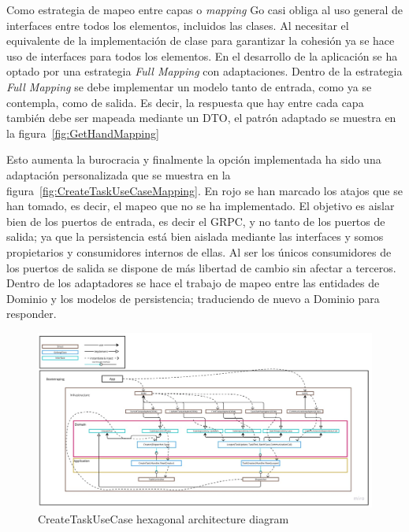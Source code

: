 Como estrategia de mapeo entre capas o \textit{mapping} Go casi obliga al uso general de interfaces entre todos los elementos, incluidos las clases.
Al necesitar el equivalente de la implementación de clase para garantizar la cohesión ya se hace uso de  interfaces para todos los elementos.
En el desarrollo de la aplicación se ha optado por una estrategia \textit{Full Mapping} con adaptaciones.
Dentro de la estrategia \textit{Full Mapping} se debe implementar un modelo tanto de entrada, como ya se contempla, como de salida.
Es decir, la respuesta que hay entre cada capa también debe ser mapeada mediante un DTO, el patrón adaptado se muestra en la figura~\cref{fig:GetHandMapping}

Esto aumenta la burocracia y finalmente la opción implementada ha sido una adaptación personalizada que se muestra en la figura~\cref{fig:CreateTaskUseCaseMapping}.
En rojo se han marcado los atajos que se han tomado, es decir, el mapeo que no se ha implementado.
El objetivo es aislar bien de los puertos de entrada, es decir el GRPC, y no tanto de los puertos de salida;
ya que la persistencia está bien aislada mediante las interfaces y somos propietarios y consumidores internos de ellas.
Al ser los únicos consumidores de los puertos de salida se dispone de más libertad de cambio sin afectar a terceros.
Dentro de los adaptadores se hace el trabajo de mapeo entre las entidades de Dominio y los modelos de persistencia; traduciendo de nuevo a Dominio para responder.

\begin{figure}[H]
    \centering
    \includegraphics[angle=90,height=1\textheight]{./part/Ejecucion/Seguimiento/CreateTaskUseCase/img/createTaskUseCaseArchitecture}
    \caption{CreateTaskUseCase hexagonal architecture diagram}\label{fig:createTaskUseCaseArchitecture}
\end{figure}

